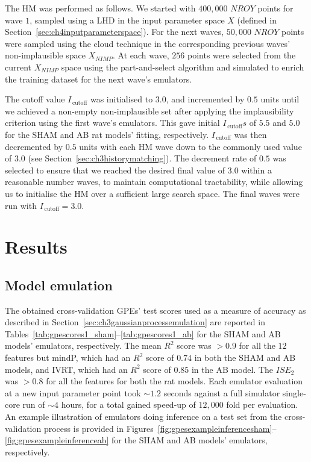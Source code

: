 \vspace{0.2cm}
The HM was performed as follows. We started with $400,000$ $NROY$ points for wave $1$, sampled using a LHD in the input parameter space $X$ (defined in Section~\ref{sec:ch4inputparameterspace}). For the next waves, $50,000$ $NROY$ points were sampled using the cloud technique in the corresponding previous waves' non-implausible space $X_{NIMP}$. At each wave, $256$ points were selected from the current $X_{NIMP}$ space using the part-and-select algorithm and simulated to enrich the training dataset for the next wave's emulators.

\vspace{0.2cm}
The cutoff value $I_{\,\text{cutoff}}$ was initialised to $3.0$, and incremented by $0.5$ units until we achieved a non-empty non-implausible set after applying the implausibility criterion using the first wave's emulators. This gave initial $I_{\,\text{cutoff}}s$ of $5.5$ and $5.0$ for the SHAM and AB rat models’ fitting, respectively. $I_{\,\text{cutoff}}$ was then decremented by $0.5$ units with each HM wave down to the commonly used value of $3.0$ (see Section~\ref{sec:ch3historymatching}). The decrement rate of $0.5$ was selected to ensure that we reached the desired final value of $3.0$ within a reasonable number waves, to maintain computational tractability, while allowing us to initialise the HM over a sufficient large search space. The final waves were run with $I_{\,\text{cutoff}}=3.0$.


%
%
%
\section{Results}\label{sec:ch4results}

%
%
%
\subsection{Model emulation}
The obtained cross-validation GPEs' test scores used as a measure of accuracy as described in Section~\ref{sec:ch3gaussianprocessemulation} are reported in Tables~\ref{tab:gpescores1_sham}--\ref{tab:gpescores1_ab} for the SHAM and AB models' emulators, respectively. The mean $R^2$ score was $>0.9$ for all the $12$ features but mindP, which had an $R^2$ score of $0.74$ in both the SHAM and AB models, and IVRT, which had an $R^2$ score of $0.85$ in the AB model. The $ISE_2$ was $>0.8$ for all the features for both the rat models. Each emulator evaluation at a new input parameter point took $\sim 1.2$ seconds against a full simulator single-core run of $\sim 4$ hours, for a total gained speed-up of $12,000$ fold per evaluation. An example illustration of emulators doing inference on a test set from the cross-validation process is provided in Figures~\ref{fig:gpesexampleinferencesham}--\ref{fig:gpesexampleinferenceab} for the SHAM and AB models' emulators, respectively.

